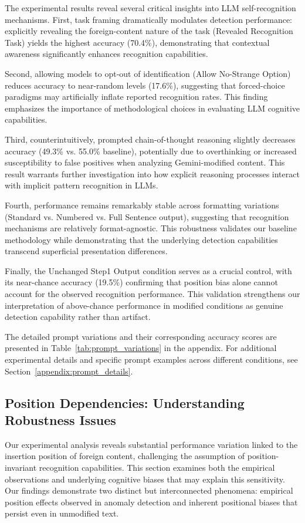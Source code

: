 \documentclass{article}
\begin{document}
The experimental results reveal several critical insights into LLM self-recognition mechanisms. First, task framing dramatically modulates detection performance: explicitly revealing the foreign-content nature of the task (Revealed Recognition Task) yields the highest accuracy (70.4\%), demonstrating that contextual awareness significantly enhances recognition capabilities.

Second, allowing models to opt-out of identification (Allow No-Strange Option) reduces accuracy to near-random levels (17.6\%), suggesting that forced-choice paradigms may artificially inflate reported recognition rates. This finding emphasizes the importance of methodological choices in evaluating LLM cognitive capabilities.

Third, counterintuitively, prompted chain-of-thought reasoning slightly decreases accuracy (49.3\% vs. 55.0\% baseline), potentially due to overthinking or increased susceptibility to false positives when analyzing Gemini-modified content. This result warrants further investigation into how explicit reasoning processes interact with implicit pattern recognition in LLMs.

Fourth, performance remains remarkably stable across formatting variations (Standard vs. Numbered vs. Full Sentence output), suggesting that recognition mechanisms are relatively format-agnostic. This robustness validates our baseline methodology while demonstrating that the underlying detection capabilities transcend superficial presentation differences.

Finally, the Unchanged Step1 Output condition serves as a crucial control, with its near-chance accuracy (19.5\%) confirming that position bias alone cannot account for the observed recognition performance. This validation strengthens our interpretation of above-chance performance in modified conditions as genuine detection capability rather than artifact.

The detailed prompt variations and their corresponding accuracy scores are presented in Table~\ref{tab:prompt_variations} in the appendix. For additional experimental details and specific prompt examples across different conditions, see Section~\ref{appendix:prompt_details}.

\subsection{Position Dependencies: Understanding Robustness Issues}

Our experimental analysis reveals substantial performance variation linked to the insertion position of foreign content, challenging the assumption of position-invariant recognition capabilities. This section examines both the empirical observations and underlying cognitive biases that may explain this sensitivity. Our findings demonstrate two distinct but interconnected phenomena: empirical position effects observed in anomaly detection and inherent positional biases that persist even in unmodified text.
\end{document}
